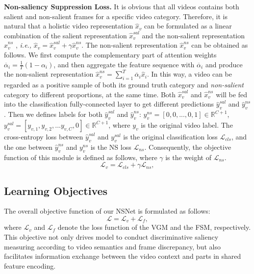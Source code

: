\documentclass[runningheads]{llncs}
\begin{document}
\noindent\textbf{Non-saliency Suppression Loss.}
It is obvious that all videos contains both salient and non-salient frames for a specific video category.
Therefore, it is natural that a holistic video representation $\hat{x}_{v}$ can be formulated as a linear combination of the salient representation $\hat{x}_{v}^{sal}$ and the non-salient representation $\hat{x}_{v}^{ns}$ \cite{bgmodel}, \textit{i.e.,} $\hat{x}_{v} = \hat{x}_{v}^{sal} + \gamma \hat{x}_{v}^{ns}$. The non-salient representation $\hat{x}_{v}^{ns}$ can be obtained as follows. We first compute the complementary part of attention weights $\overline{\alpha}_i = \frac{1}{T}(1-\alpha_{i})$, and then
aggregate the feature sequence with $\overline{\alpha}_i$ and produce the non-salient representation $\hat{x}_{v}^{ns}=\sum_{i=1}^T \overline{\alpha}_{i} \hat{x}_i.$
In this way, a video can be regarded as a positive sample of both its ground truth category and \textit{non-salient} category to different proportions, at the same time. 
Both $\hat{x}_{v}^{sal}$ and $\hat{x}_{v}^{ns}$ will be fed into the classification fully-connected layer to get different predictions $\hat{y}^{sal}_{v}$ and $\hat{y}^{ns}_{v}$. 
Then we defines labels for both $\hat{y}^{sal}_{v}$ and $\hat{y}^{ns}_{v}$:
$y^{ns}_{v}=[0,0,...,0,1]\in \mathbb{R}^{C+1}$,\, $y^{sal}_{v}=[y_{v,1},y_{v,2},...y_{v,C},0] \in \mathbb{R}^{C+1}$, where $y_v$ is the original video label.
The cross-entropy loss between $\hat{y}^{sal}_{v}$ and $y^{sal}_{v}$ is the original classification loss $\mathcal{L}_{cls}$, and the one between $\hat{y}^{ns}_{v}$ and $y^{ns}_{v}$ is the NS loss $\mathcal{L}_{ns}$.
Consequently, the objective function of this module is defined as follows, where $\gamma$ is the weight of $\mathcal{L}_{ns}$.
\begin{equation}
    \mathcal{L}_v = \mathcal{L}_{cls} + \gamma \mathcal{L}_{ns},
\end{equation}
\label{v_loss} 
\subsection{Learning Objectives}
The overall objective function of our NSNet is formulated as follows:
\begin{equation}
    \mathcal{L} =  \mathcal{L}_v + \mathcal{L}_f,
\end{equation}\label{total_loss}
where $\mathcal{L}_v$ and $\mathcal{L}_f$ denote the loss function of the VGM and the FSM, respectively. This objective not only drives model to conduct discriminative saliency measuring according to video semantics and frame discrepancy, but also facilitates information exchange between the video context and parts in shared feature encoding. 
\end{document}
